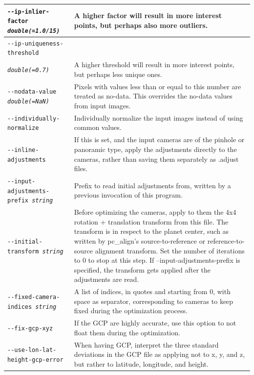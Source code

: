 \begin{longtable}{|p{8cm}|p{9cm}|}
\texttt{-\/-ip-inlier-factor \textit{double(=1.0/15)}} & 
A higher factor will result in more interest points, but perhaps also more outliers.
\\ \hline

\texttt{-\/-ip-uniqueness-threshold} \\
\texttt{\textit{double(=0.7)}} & 
A higher threshold will result in more interest points, but perhaps less unique ones.
\\ \hline

\texttt{-\/-nodata-value \textit{double(=NaN)}} & 
Pixels with values less than or equal to this number are treated as no-data. This overrides the no-data values from input images.
\\ \hline

\texttt{-\/-individually-normalize} & Individually normalize the input images instead of using common values.
\\ \hline

\texttt{-\/-inline-adjustments} & If this is set, and the input cameras are of the pinhole or panoramic type, apply the adjustments directly to the cameras, rather than saving them separately as .adjust files. 
\\ \hline

\texttt{-\/-input-adjustments-prefix \textit{string}} & Prefix to read initial adjustments from, written by a previous invocation of this program. \\ \hline

\texttt{-\/-initial-transform \textit{string}} & Before optimizing the cameras, apply to them the 4x4 rotation + translation transform from this file. The transform is in respect to the planet center, such as written by pc\_align's source-to-reference or reference-to-source alignment transform. Set the number of iterations to 0 to stop at this step. If --input-adjustments-prefix is specified, the transform gets applied after the adjustments are read. \\ \hline

\texttt{-\/-fixed-camera-indices \textit{string}} & A list of indices, in quotes and starting from 0, with space as separator, corresponding to cameras to keep fixed during the optimization process.
\\ \hline

\texttt{-\/-fix-gcp-xyz} & If the GCP are highly accurate, use this option to not float them during the optimization.\\ \hline


\texttt{-\/-use-lon-lat-height-gcp-error} & When having GCP, interpret the three standard deviations in the GCP file as applying not to x, y, and z, but rather to latitude, longitude, and height.\\ \hline


\end{longtable}
